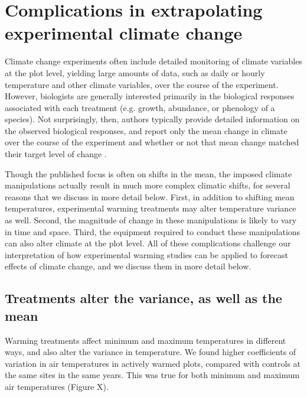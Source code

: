\documentclass{article}
\begin{document}
\section* {Complications in extrapolating experimental climate change}
Climate change experiments often include detailed monitoring of climate variables at the plot level, yielding large amounts of data, such as daily or hourly temperature and other climate variables, over the course of the experiment. However, biologists are generally interested primarily in the biological responses associated with each treatment (e.g. growth, abundance, or phenology of a species). Not surprisingly, then, authors typically provide detailed information on the observed biological responses, and report only the mean change in climate over the course of the experiment and whether or not that mean change matched their target level of change \citep[e.g.][]{price1998,clark2014a,clark2014b,rollinson2012}. 
\par Though the published focus is often on shifts in the mean, the imposed climate manipulations actually result in much more complex climatic shifts, for several reasons that we discuss in more detail below. First, in addition to shifting mean temperatures, experimental warming treatments may alter temperature variance as well. Second, the magnitude of change in these manipulations is likely to vary in time and space. Third, the equipment required to conduct these manipulations can also alter climate at the plot level. All of these complications challenge our interpretation of how experimental warming studies can be applied to forecast effects of climate change, and we discuss them in more detail below.
\subsection* {Treatments alter the variance, as well as the mean}
Warming treatments affect minimum and maximum temperatures in different ways, and also alter the variance in temperature. We found higher coefficients of variation in air temperatures in actively warmed plots, compared with controls at the same sites in the same years. This was true for both minimum and maximum air temperatures (Figure X). 
\end{document}
